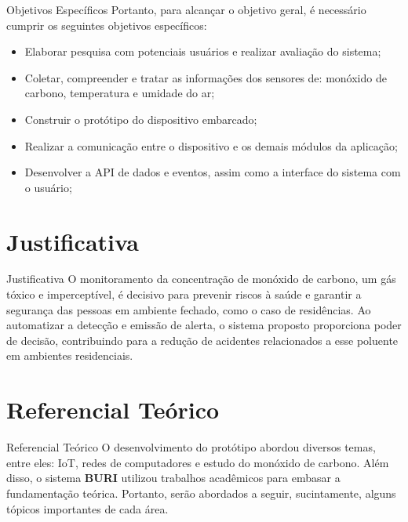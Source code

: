 \documentclass[12pt]{beamer}
\begin{document}
    \begin{frame}{Objetivos Específicos}
        Portanto, para alcançar o objetivo geral, é necessário cumprir os seguintes objetivos específicos:
        \begin{itemize}
            \item Elaborar pesquisa com potenciais usuários e realizar avaliação do sistema;
            \item Coletar, compreender e tratar as informações dos sensores de: monóxido de carbono, temperatura e umidade do ar;
            \item Construir o protótipo do dispositivo embarcado;
            \item Realizar a comunicação entre o dispositivo e os demais módulos da aplicação;
            \item Desenvolver a API de dados e eventos, assim como a interface do sistema com o usuário;
        \end{itemize} 
    \end{frame}

    \section{Justificativa}

    \begin{frame}{Justificativa}
        O monitoramento da concentração de monóxido de carbono, um gás tóxico e imperceptível, é decisivo para prevenir riscos 
        à saúde e garantir a segurança das pessoas em ambiente fechado, como o caso de residências. Ao automatizar a detecção e 
        emissão de alerta, o sistema proposto proporciona poder de decisão, contribuindo para a redução de acidentes
        relacionados a esse poluente em ambientes residenciais.   
    \end{frame}

    \section{Referencial Teórico}

    \begin{frame}{Referencial Teórico}
        O desenvolvimento do protótipo abordou diversos temas, entre eles: 
        IoT, redes de computadores e estudo do monóxido de carbono. Além disso, o sistema 
        \textbf{BURI} utilizou trabalhos acadêmicos para embasar a fundamentação teórica. Portanto, 
        serão abordados a seguir, sucintamente, alguns tópicos importantes de cada área.
    \end{frame}
\end{document}
